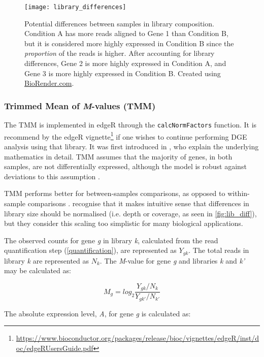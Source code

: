 \begin{figure}[!ht]
    \centering
    \texttt{[image: library\_differences]}
    \caption[Differences in library composition between samples]{Potential differences between samples in library composition. Condition A has more reads aligned to Gene 1 than Condition B, but it is considered more highly expressed in Condition B since the \textit{proportion} of the reads is higher. After accounting for library differences, Gene 2 is more highly expressed in Condition A, and Gene 3 is more highly expressed in Condition B. Created using \href{https://biorender.com/}{BioRender.com}. } 
    \label{fig:lib_diff}
\end{figure}
\clearpage

\subsubsection{Trimmed Mean of \textit{M}-values (TMM)}
\label{TMM}

The \ac{TMM} is implemented in edgeR \citep{edger} through the  \texttt{calcNormFactors} function. It is recommend by the edgeR vignette\footnote{\url{https://www.bioconductor.org/packages/release/bioc/vignettes/edgeR/inst/doc/edgeRUsersGuide.pdf}} if one wishes to continue performing \ac{DGE} analysis using that library. It was first introduced in \cite{robinson2010scaling}, who explain the underlying mathematics in detail. \ac{TMM} assumes that the majority of genes, in both samples, are not differentially expressed, although the model is robust against deviations to this assumption \citep{robinson2010scaling}. 

\ac{TMM} performs better for between-samples comparisons, as opposed to within-sample comparisons \citep{dundar2015introduction}. \cite{robinson2010scaling} recognise that it makes intuitive sense that differences in library size should be normalised (i.e. depth or coverage, as seen in \autoref{fig:lib_diff}), but they consider this scaling too simplistic for many biological applications. 

The observed counts for gene \textit{g} in library \textit{k}, calculated from the read quantification step (\autoref{quantification}), are represented as $Y_{gk}$. The total reads in library \textit{k} are represented as $N_k$. The  \textit{M}-value for gene \textit{g} and libraries \textit{k} and \textit{k'} may be calculated as:

$$ M_g = log_2 \frac{Y_{gk}/N_k}{Y_{gk'}/N_{k'}}$$

The absolute expression level, \textit{A}, for gene \textit{g} is calculated as:

